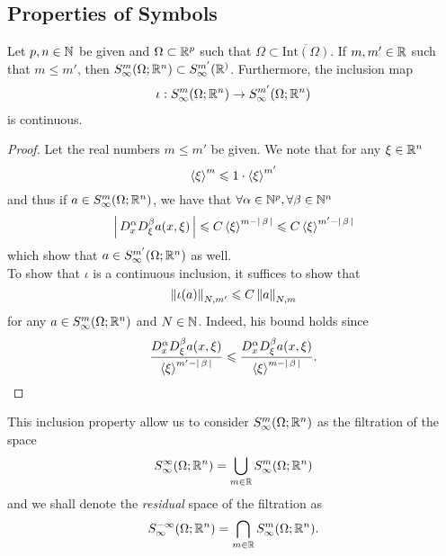 \documentclass{article}
\begin{document}
\subsection{Properties of Symbols}

\begin{fprop}
    Let $p, n \in \N$ be given and $\Omega \subset \R^p$ such that $\Omega \subset \overline{\mathrm{Int}(\Omega)}$. If $m, m' \in \R$ such that $m \leq m'$, then $S^m_\infty(\Omega; \R^n) \subset S^{m'}_\infty(\R^)$. Furthermore, the inclusion map 
    \begin{align*}
    \iota: S^m_\infty(\Omega; \R^n) \to S^{m'}_\infty(\Omega; \R^n)
    \end{align*}
    is continuous. 
\end{fprop}
\begin{proof}
    Let the real numbers $m \leq m'$ be given. We note that for any $\xi \in \R^n$
    \[
     \sym[\xi]^m \leq 1 \cdot \sym[\xi]^{m'}
     \]
    and thus if $a \in S^{m}_\infty(\Omega; \R^n)$, we have that $\forall \alpha \in \N^p, \forall \beta \in \N^n$
    \[
    \abs{D^\alpha_x D^\beta_\xi a(x, \xi)} \leq C \sym[\xi]^{m - \abs{\beta}} \leq C \sym[\xi]^{m' - \abs{\beta}} 
    \]
    which show that $a \in S^{m'}_\infty(\Omega; \R^n)$ as well. \\
    
    To show that $\iota$ is a continuous inclusion, it suffices to show that 
    \[
    \norm[\iota(a)]_{N, m'} \leq C \norm[a]_{N, m}
    \]
    for any $a \in S^{m}_\infty(\Omega; \R^n)$ and $N \in \N$. Indeed, his bound holds since 
    \[
    \frac{D^\alpha_x D^\beta_\xi a(x, \xi)}{\sym[\xi]^{m' - \abs{\beta}}}  \leq \frac{D^\alpha_x D^\beta_\xi a(x, \xi)}{\sym[\xi]^{m - \abs{\beta}}}. 
    \]
\end{proof}

This inclusion property allow us to consider $S^{m}_\infty(\Omega; \R^n)$ as the filtration of the space 
\[
S^\infty_\infty(\Omega; \R^n) = \bigcup_{m \in \R} S^{m}_\infty(\Omega; \R^n)
\]
and we shall denote the \emph{residual} space of the filtration as 
\[
S^{-\infty}_\infty(\Omega; \R^n) = \bigcap_{m \in \R} S^{m}_\infty(\Omega; \R^n). 
\]
\end{document}
